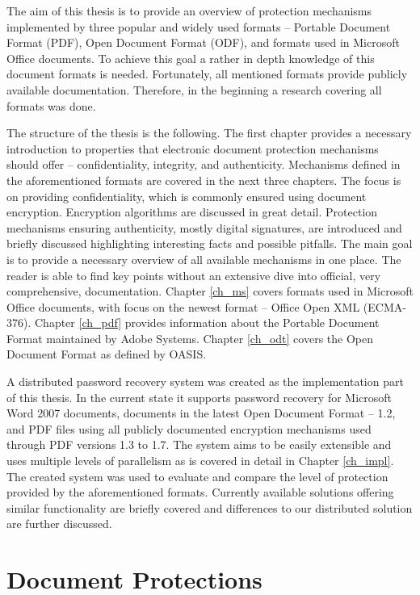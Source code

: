 \documentclass[11pt,oneside]{fithesis2}
\begin{document}
The aim of this thesis is to provide an overview of protection mechanisms implemented by three popular and widely used formats -- Portable Document Format (PDF), Open Document Format (ODF), and formats used in Microsoft Office documents. To achieve this goal a rather in depth knowledge of this document formats is needed. Fortunately, all mentioned formats provide publicly available documentation. Therefore, in the beginning a research covering all formats was done. 

The structure of the thesis is the following. The first chapter provides a necessary introduction to properties that electronic document protection mechanisms should offer -- confidentiality, integrity, and authenticity. Mechanisms defined in the aforementioned formats are covered in the next three chapters. The focus is on providing confidentiality, which is commonly ensured using document encryption. Encryption algorithms are discussed in great detail. Protection mechanisms ensuring authenticity, mostly digital signatures, are introduced and briefly discussed highlighting interesting facts and possible pitfalls. The main goal is to provide a necessary overview of all available mechanisms in one place. The reader is able to find key points without an extensive dive into official, very comprehensive, documentation. Chapter \ref{ch_ms} covers formats used in Microsoft Office documents, with focus on the newest format -- Office Open XML (ECMA-376). Chapter \ref{ch_pdf} provides information about the Portable Document Format maintained by Adobe Systems. Chapter \ref{ch_odt} covers the Open Document Format as defined by OASIS.

A distributed password recovery system was created as the implementation part of this thesis. In the current state it supports password recovery for Microsoft Word 2007 documents, documents in the latest Open Document Format -- 1.2, and PDF files using all publicly documented encryption mechanisms used through PDF versions 1.3 to 1.7. The system aims to be easily extensible and uses multiple levels of  parallelism as is covered in detail in Chapter \ref{ch_impl}. The created system was used to evaluate and compare the level of protection provided by the aforementioned formats. Currently available solutions offering similar functionality are briefly covered and differences to our distributed solution are further discussed.
 
\chapter{Document Protections}
\end{document}
